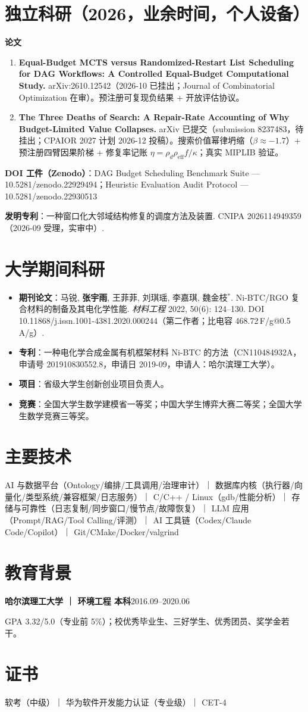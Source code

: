 \documentclass[11pt,a4paper]{article}
\begin{document}
\section{独立科研（2026，业余时间，个人设备）}
\textbf{论文}
\begin{enumerate}
\item \textbf{Equal-Budget MCTS versus Randomized-Restart List Scheduling for DAG Workflows: A Controlled Equal-Budget Computational Study.} arXiv:2610.12542（2026-10 已挂出；Journal of Combinatorial Optimization 在审）。预注册可复现负结果 + 开放评估协议。
\item \textbf{The Three Deaths of Search: A Repair-Rate Accounting of Why Budget-Limited Value Collapses.} arXiv 已提交（submission 8237483，待挂出；CPAIOR 2027 计划 2026-12 投稿）。搜索价值幂律坍缩（$\beta\approx-1.7$）+ 预注册四臂因果阶梯 + 修复率记账 $\eta=\rho_d\rho_{\mathrm{eff}}f/\kappa$；真实 MIPLIB 验证。
\end{enumerate}
\textbf{DOI 工件（Zenodo）}：DAG Budget Scheduling Benchmark Suite — 10.5281/zenodo.22929494；Heuristic Evaluation Audit Protocol — 10.5281/zenodo.22930513\par
\textbf{发明专利}：一种窗口化大邻域结构修复的调度方法及装置. CNIPA 2026114949359（2026-09 受理，实审中）.

\section{大学期间科研}
\begin{itemize}
\item \textbf{期刊论文}：马锐, \textbf{张宇雨}, 王菲菲, 刘琪瑶, 李嘉琪, 魏金枝$^*$. Ni-BTC/RGO 复合材料的制备及其电化学性能. \textit{材料工程} 2022, 50(6): 124--130. DOI 10.11868/j.issn.1001-4381.2020.000244（第二作者；比电容 468.72\,F/g@0.5\,A/g）.
\item \textbf{专利}：一种电化学合成金属有机框架材料 Ni-BTC 的方法（CN110484932A，申请号 201910830552.8，申请日 2019-09，申请人：哈尔滨理工大学）。
\item \textbf{项目}：省级大学生创新创业项目负责人。
\item \textbf{竞赛}：全国大学生数学建模省一等奖；中国大学生博弈大赛二等奖；全国大学生数学竞赛三等奖。
\end{itemize}

\section{主要技术}
AI 与数据平台（Ontology/编排/工具调用/治理审计）｜ 数据库内核（执行器/向量化/类型系统/兼容框架/日志服务）｜ C/C++ / Linux（gdb/性能分析）｜ 存储与可靠性（日志复制/同步窗口/慢节点/故障恢复）｜ LLM 应用（Prompt/RAG/Tool Calling/评测）｜ AI 工具链（Codex/Claude Code/Copilot）｜ Git/CMake/Docker/valgrind

\section{教育背景}
\textbf{哈尔滨理工大学 ｜ 环境工程 本科}\hfill 2016.09--2020.06\par
GPA 3.32/5.0（专业前 5\%）；校优秀毕业生、三好学生、优秀团员、奖学金若干。

\section{证书}
软考（中级）｜ 华为软件开发能力认证（专业级）｜ CET-4
\end{document}

